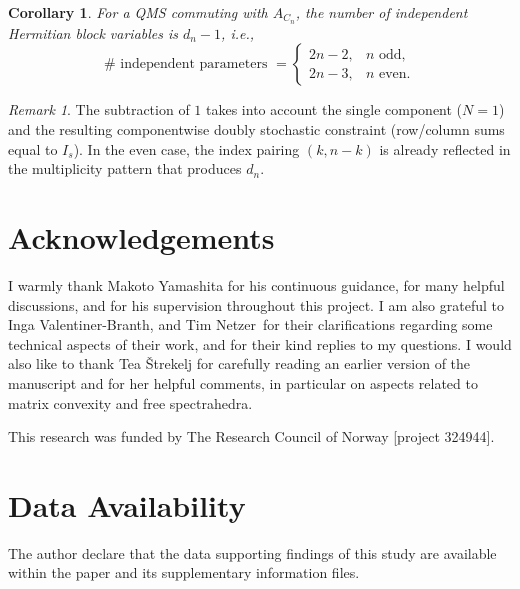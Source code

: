 \documentclass[11pt, a4paper]{article}
\theoremstyle{plain}
\newtheorem{corollary}[theorem]{Corollary}
\theoremstyle{definition}
\theoremstyle{remark}
\newtheorem{remark}[theorem]{Remark}
\begin{document}
\begin{corollary}
For a QMS commuting with \(A_{C_n}\), the number of independent
Hermitian block variables is \(d_n - 1\), i.e.,
\[
\#\text{ independent parameters } =
\begin{cases}
2n - 2, & \text{\(n\) odd},\\[1mm]
2n - 3, & \text{\(n\) even}.
\end{cases}
\]
\end{corollary}

\begin{remark}
The subtraction of \(1\) takes into account the single component (\(N=1\)) and the
resulting componentwise doubly stochastic constraint (row/column sums equal to \(I_s\)).
In the even case, the index pairing \((k,n-k)\) is already reflected in the
multiplicity pattern that produces \(d_n\).
\end{remark}



\section*{Acknowledgements}

I warmly thank Makoto Yamashita for his continuous guidance, for many helpful discussions,
and for his supervision throughout this project.
I am also grateful to  Inga  Valentiner-Branth, and Tim Netzer\ for their clarifications regarding
some technical aspects of their work, and for their kind replies to my questions.
I would also like to thank Tea Štrekelj for carefully reading an earlier version of the manuscript
and for her helpful comments, in particular on aspects related to matrix convexity
and free spectrahedra.

This research was funded by The Research Council of Norway [project 324944].
\section*{Data Availability}

The author declare that the data supporting findings of this study are available within the paper and its supplementary information files.
\end{document}
